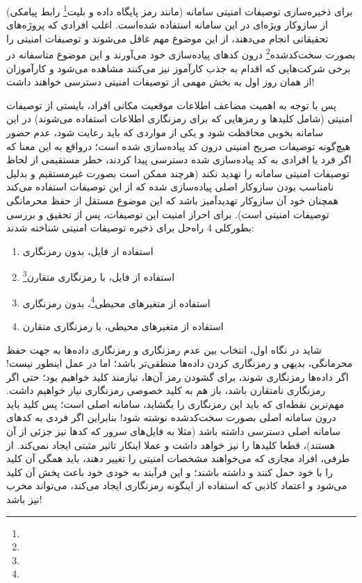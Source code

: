برای ذخیره‌سازی توصیفات امنیتی سامانه (مانند رمز پایگاه داده و بلیت\footnote{} رابط پیامکی) از سازوکار ویژه‌ای در این سامانه استفاده شده‌است. اغلب افرادی که پروژه‌های تحقیقاتی انجام می‌دهند، از این موضوع مهم غافل می‌شوند و توصیفات امنیتی را بصورت سخت‌کدشده\footnote{} درون کدهای پیاده‌سازی خود می‌آورند و این موضوع متاسفانه در برخی شرکت‌هایی که اقدام به جذب کارآموز نیز می‌کنند مشاهده می‌شود و کارآموزان از همان روز اول به بخش مهمی از توصیفات امنیتی دسترسی خواهند داشت!


پس با توجه به اهمیت مضاعف اطلاعات موقعیت مکانی افراد، بایستی از توصیفات امنیتی (شامل کلیدها و رمزهایی که برای رمزنگاری اطلاعات استفاده می‌شوند) در این سامانه بخوبی محافظت شود و یکی از مواردی که باید رعایت شود، عدم حضور هیچ‌گونه توصیفات صریح امنیتی درون کد پیاده‌سازی شده است؛ درواقع به این معنا که اگر فرد یا افرادی به کد پیاده‌سازی شده دسترسی پیدا کردند، خطر مستقیمی از لحاظ توصیفات امنیتی سامانه را تهدید نکند (هرچند ممکن است بصورت غیرمستقیم و بدلیل نامناسب بودن سازوکار اصلی پیاده‌سازی شده که از این توصیفات استفاده می‌کند همچنان خود آن سازوکار تهدیدآمیز باشد که این موضوع مستقل از حفظ محرمانگی توصیفات امنیتی است). برای احراز امنیت این توصیفات، پس از تحقیق و بررسی بطورکلی 4 راه‌حل برای ذخیره توصیفات امنیتی شناخته شدند\cite{secrets}:

\begin{enumerate}
	\item استفاده از فایل، بدون رمزنگاری
	\item استفاده از فایل، با رمزنگاری متقارن\footnote{}
	\item استفاده از متغیرهای محیطی\footnote{}، بدون رمزنگاری
	\item استفاده از متغیرهای محیطی، با رمزنگاری متقارن
\end{enumerate}

شاید در نگاه اول، انتخاب بین عدم رمزنگاری و رمزنگاری داده‌ها به جهت حفظ محرمانگی، بدیهی و رمزنگاری کردن داده‌ها منطقی‌تر باشد؛ اما در عمل اینطور نیست! اگر داده‌ها رمزنگاری شوند، برای گشودن رمز آن‌ها، نیازمند کلید خواهیم بود؛ حتی اگر رمزنگاری نامتقارن باشد، باز هم به کلید خصوصی رمزنگاری نیاز خواهیم داشت. مهم‌ترین نقطه‌ای که باید این رمزنگاری را بگشاید، سامانه اصلی است؛ پس کلید باید درون سامانه اصلی بصورت سخت‌کدشده نوشته شود! بنابراین اگر فردی به کدهای سامانه اصلی دسترسی داشته باشد (مثلا به فایل‌های سرور که کدها نیز جزئی از آن هستند)، قطعا کلیدها را نیز خواهد داشت و عملا اینکار تاثیر مثبتی ایجاد نمی‌کند. از طرفی، افراد مجازی که می‌خواهند مشخصات امنیتی را تغییر دهند،‌ باید همگی آن کلید را با خود حمل کنند و داشته باشند؛ و این فرآیند به خودی خود باعث پخش آن کلید می‌شود و اعتماد کاذبی که استفاده از اینگونه رمزنگاری ایجاد می‌کند، می‌تواند مخرب نیز باشد!

